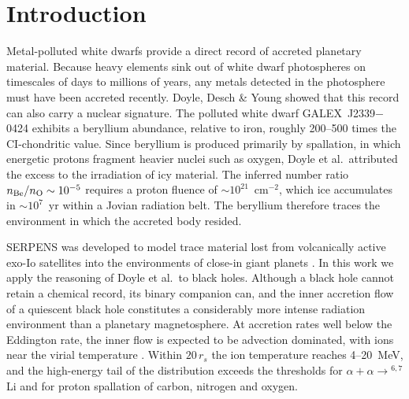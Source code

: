\documentclass[twocolumn,showpacs,preprintnumbers,amsmath,amssymb]{revtex4}
\newcommand{\runningheads}[2]{\markboth{\hfill #1\hfill}{\hfill #2\hfill}}
\begin{document}
\maketitle

\runningheads{}{\em Polluted Black Hole Companions}


\section{\label{h:intro} Introduction}

Metal-polluted white dwarfs provide a direct record of accreted planetary material. Because heavy elements sink out of white dwarf photospheres on timescales of days to millions of years, any metals detected in the photosphere must have been accreted recently. Doyle, Desch \& Young \cite{Doyle_2021} showed that this record can also carry a nuclear signature. The polluted white dwarf GALEX~J2339$-$0424 exhibits a beryllium abundance, relative to iron, roughly 200--500 times the CI-chondritic value. Since beryllium is produced primarily by spallation, in which energetic protons fragment heavier nuclei such as oxygen, Doyle et al.\ attributed the excess to the irradiation of icy material. The inferred number ratio $n_{\rm Be}/n_{\rm O}\sim 10^{-5}$ requires a proton fluence of $\sim 10^{21}$~cm$^{-2}$, which ice accumulates in $\sim 10^{7}$~yr within a Jovian radiation belt. The beryllium therefore traces the environment in which the accreted body resided.

SERPENS was developed to model trace material lost from volcanically active exo-Io satellites into the environments of close-in giant planets \cite{Oza_2019,Meyer_zu_Westram}. In this work we apply the reasoning of Doyle et al.\ to black holes. Although a black hole cannot retain a chemical record, its binary companion can, and the inner accretion flow of a quiescent black hole constitutes a considerably more intense radiation environment than a planetary magnetosphere. At accretion rates well below the Eddington rate, the inner flow is expected to be advection dominated, with ions near the virial temperature \cite{NarayanYi_1995,NMQ1998,YuanNarayan_2014}. Within $20\,r_s$ the ion temperature reaches 4--20~MeV, and the high-energy tail of the distribution exceeds the thresholds for $\alpha+\alpha\rightarrow{}^{6,7}$Li and for proton spallation of carbon, nitrogen and oxygen.
\end{document}
